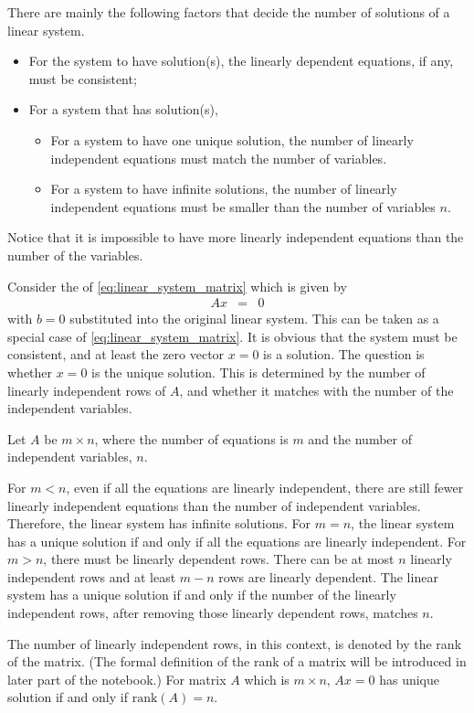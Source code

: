There are mainly the following factors that decide the number of solutions of a linear system.
\begin{itemize}
    \item For the system to have solution(s), the linearly dependent equations, if any, must be consistent;
    \item For a system that has solution(s),
    \begin{itemize}
      \item For a system to have one unique solution, the number of linearly independent equations must match the number of variables.
      \item For a system to have infinite solutions, the number of linearly independent equations must be smaller than the number of variables $n$.
    \end{itemize}
\end{itemize}
Notice that it is impossible to have more linearly independent equations than the number of the variables.

Consider the  of \eqref{eq:linear_system_matrix} which is given by
\begin{eqnarray}
  Ax &=& 0 \nonumber
\end{eqnarray}
with $b=0$ substituted into the original linear system. This can be taken as a special case of \eqref{eq:linear_system_matrix}. It is obvious that the system must be consistent, and at least the zero vector $x=0$ is a solution. The question is whether $x=0$ is the unique solution. This is determined by the number of linearly independent rows of $A$, and whether it matches with the number of the independent variables. 

Let $A$ be $m \times n$, where the number of equations is $m$ and the number of independent variables, $n$. 

For $m<n$, even if all the equations are linearly independent, there are still fewer linearly independent equations than the number of independent variables. Therefore, the linear system has infinite solutions. For $m=n$, the linear system has a unique solution if and only if all the equations are linearly independent. For $m>n$, there must be linearly dependent rows. There can be at most $n$ linearly independent rows and at least $m-n$ rows are linearly dependent. The linear system has a unique solution if and only if the number of the linearly independent rows, after removing those linearly dependent rows, matches $n$. 

The number of linearly independent rows, in this context, is denoted by the rank of the matrix. (The formal definition of the rank of a matrix will be introduced in later part of the notebook.) For matrix $A$ which is $m\times n$, $Ax=0$ has unique solution if and only if $\mathrm{rank}(A)=n$.

